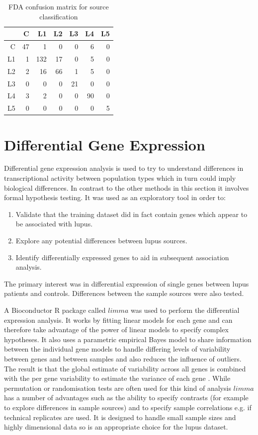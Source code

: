 \documentclass[a4paper, 12pt]{report}
\begin{document}
\begin{table}[h]
\centering
\begin{tabular}{rrrrrrr}
  \hline
 & C & L1 & L2 & L3 & L4 & L5 \\ 
  \hline
C &  47 &   1 &   0 &   0 &   6 &   0 \\ 
  L1 &   1 & 132 &  17 &   0 &   5 &   0 \\ 
  L2 &   2 &  16 &  66 &   1 &   5 &   0 \\ 
  L3 &   0 &   0 &   0 &  21 &   0 &   0 \\ 
  L4 &   3 &   2 &   0 &   0 &  90 &   0 \\ 
  L5 &   0 &   0 &   0 &   0 &   0 &   5 \\ 
   \hline
\end{tabular}
\caption{FDA confusion matrix for source classification} 
\label{T:confusion2}
\end{table}

\section{Differential Gene Expression}
Differential gene expression analysis is used to try to understand differences in transcriptional activity between population types which in turn could imply biological differences. In contrast to the other methods in this section it involves formal hypothesis testing. It was used as an exploratory tool in order to:

\begin{enumerate}
\item Validate that the training dataset did in fact contain genes which appear to be associated with lupus.
\item Explore any potential differences between lupus sources.
\item Identify differentially expressed genes to aid in subsequent association analysis.
\end{enumerate}

The primary interest was in differential expression of single genes between lupus patients and controls. Differences between the sample sources were also tested.

A Bioconductor R package called $limma$ \cite{limma} was used to perform the differential expression analysis.  It works by fitting linear models for each gene and can therefore take advantage of the power of linear models to specify complex hypotheses. It also uses a parametric empirical Bayes model to share information between the individual gene models to handle differing levels of variability between genes and between samples and also reduces the influence of outliers. The result is that the global estimate of variability across all genes is combined with the per gene variability to  estimate the variance of  each gene \cite{limma}. While permutation or randomisation tests are often used for this kind of analysis $limma$ has a number of advantages such as the ability to specify contrasts (for example to explore differences in sample sources) and to specify sample correlations e.g. if technical replicates are used.  It is designed to handle small sample sizes and highly dimensional data so is an appropriate choice for the lupus dataset.
\end{document}
